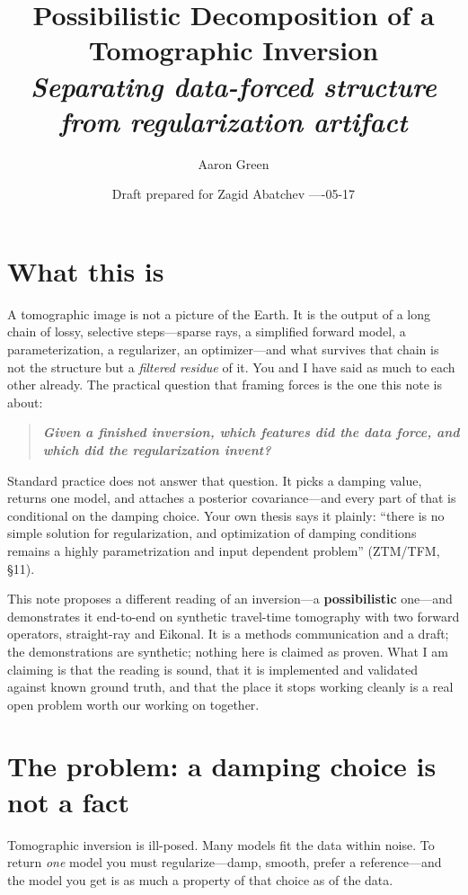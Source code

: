 \documentclass[11pt]{article}
\title{\textbf{Possibilistic Decomposition of a Tomographic Inversion}\\[6pt]
  {\large\itshape Separating data-forced structure from regularization
  artifact}}
\author{Aaron Green}
\date{Draft prepared for Zagid Abatchev \;---\; 2026-05-17}
\begin{document}
\maketitle

\section*{What this is}

A tomographic image is not a picture of the Earth. It is the output of a long
chain of lossy, selective steps---sparse rays, a simplified forward model, a
parameterization, a regularizer, an optimizer---and what survives that chain is
not the structure but a \emph{filtered residue} of it. You and I have said as
much to each other already. The practical question that framing forces is the
one this note is about:

\begin{quote}
\itshape\bfseries Given a finished inversion, which features did the data
force, and which did the regularization invent?
\end{quote}

Standard practice does not answer that question. It picks a damping value,
returns one model, and attaches a posterior covariance---and every part of that
is conditional on the damping choice. Your own thesis says it plainly:
``there is no simple solution for regularization, and optimization of damping
conditions remains a highly parametrization and input dependent problem''
(ZTM/TFM, \S11).

This note proposes a different reading of an inversion---a
\textbf{possibilistic} one---and demonstrates it end-to-end on synthetic
travel-time tomography with two forward operators, straight-ray and Eikonal. It
is a methods communication and a draft; the demonstrations are synthetic;
nothing here is claimed as proven. What I am claiming is that the reading is
sound, that it is implemented and validated against known ground truth, and
that the place it stops working cleanly is a real open problem worth our
working on together.

\section{The problem: a damping choice is not a fact}

Tomographic inversion is ill-posed. Many models fit the data within noise. To
return \emph{one} model you must regularize---damp, smooth, prefer a
reference---and the model you get is as much a property of that choice as of
the data.
\end{document}
